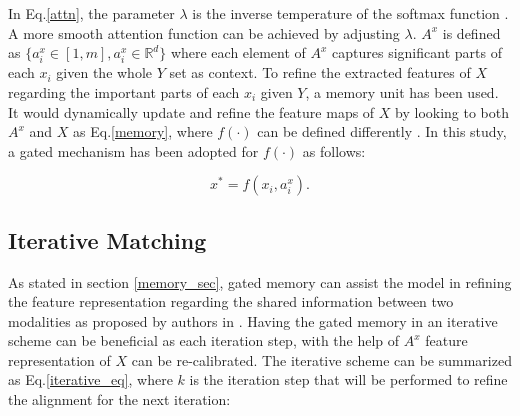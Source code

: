 \documentclass{midl}
\begin{document}
 
In Eq.\ref{attn}, the parameter $\lambda$ is the inverse temperature of the softmax function  \cite{chorowski2015attention}. A more smooth attention function can be achieved by adjusting $\lambda$. $A^x$ is defined as $\{a_{i}^x \in [1,m], a_{i}^x \in \mathbb{R}^d\}$ where each element of $A^x$ captures significant  parts of each $x_i$ given the whole $Y$ set as context. To refine the extracted features of $X$ regarding the important parts of each $x_i$ given $Y$, a memory unit has been used. It would dynamically update and refine the feature maps of $X$ by looking to both $A^x$ and $X$ as Eq.\ref{memory}, where $f(\cdot)$ can be defined differently \cite{kalra2020learning,weston2014memory,burtsev2020memory}. In this study, a gated mechanism has been adopted for $f(\cdot)$ as follows:

\begin{equation}\label{memory}
x^* = f(x_i,a_i^x).
\end{equation}






\subsection{Iterative Matching}
\label{iterative}
As stated in section \ref{memory_sec}, gated memory can assist the model in refining the feature representation regarding the shared information between two modalities as proposed by authors in \cite{chen2020imram}. Having the gated memory in an iterative scheme can be beneficial as each iteration step, with the help of $A^x$ feature representation of $X$ can be re-calibrated. The iterative scheme can be summarized as Eq.\ref{iterative_eq}, where $k$ is the iteration step that will be performed to refine the alignment for the next iteration: 
\end{document}
